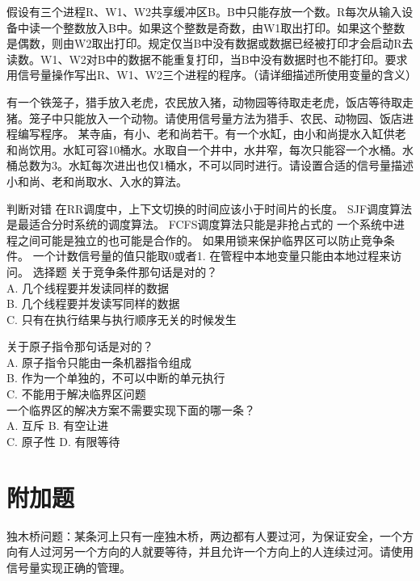 \documentclass{ctexart}
\begin{document}
\begin{outline}[enumerate]
    \1 假设有三个进程R、W1、W2共享缓冲区B。B中只能存放一个数。R每次从输入设备中读一个整数放入B中。如果这个整数是奇数，由W1取出打印。如果这个整数是偶数，则由W2取出打印。规定仅当B中没有数据或数据已经被打印才会启动R去读数。W1、W2对B中的数据不能重复打印，当B中没有数据时也不能打印。要求用信号量操作写出R、W1、W2三个进程的程序。（请详细描述所使用变量的含义）
    
    \1 有一个铁笼子，猎手放入老虎，农民放入猪，动物园等待取走老虎，饭店等待取走猪。笼子中只能放入一个动物。请使用信号量方法为猎手、农民、动物园、饭店进程编写程序。
    \1 某寺庙，有小、老和尚若干。有一个水缸，由小和尚提水入缸供老和尚饮用。水缸可容10桶水。水取自一个井中，水井窄，每次只能容一个水桶。水桶总数为3。水缸每次进出也仅1桶水，不可以同时进行。请设置合适的信号量描述小和尚、老和尚取水、入水的算法。

    \1 判断对错
    \2 在RR调度中，上下文切换的时间应该小于时间片的长度。
    \2 SJF调度算法是最适合分时系统的调度算法。
    \2 FCFS调度算法只能是非抢占式的
    \2 一个系统中进程之间可能是独立的也可能是合作的。
    \2 如果用锁来保护临界区可以防止竞争条件。
    \2 一个计数信号量的值只能取0或者1.
    \2 在管程中本地变量只能由本地过程来访问。
    \1 选择题
    关于竞争条件那句话是对的？ \\
    A. 几个线程要并发读同样的数据 \\
    B. 几个线程要并发读写同样的数据 \\
    C. 只有在执行结果与执行顺序无关的时候发生


    \1 关于原子指令那句话是对的？ \\
    A. 原子指令只能由一条机器指令组成 \\
    B. 作为一个单独的，不可以中断的单元执行 \\
    C. 不能用于解决临界区问题 \\
    \1 一个临界区的解决方案不需要实现下面的哪一条？ \\
    A. 互斥		B. 有空让进 \\
    C. 原子性		D. 有限等待 \\

\end{outline}

\section{附加题}
\begin{outline}[enumerate]
    \1 独木桥问题：某条河上只有一座独木桥，两边都有人要过河，为保证安全，一个方向有人过河另一个方向的人就要等待，并且允许一个方向上的人连续过河。请使用信号量实现正确的管理。

    
\end{outline}
\end{document}
